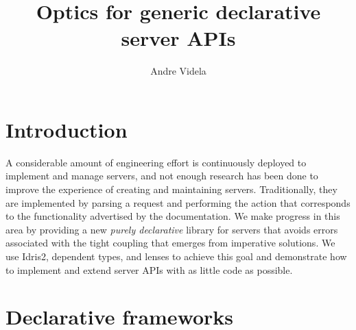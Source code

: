 \documentclass[sigplan,screen,review, nonacm]{acmart}
\begin{document}
\title{Optics for generic declarative server APIs}

\author{Andre Videla}



\maketitle
\hypertarget{introduction}{%
\section{Introduction}\label{introduction}}

A considerable amount of engineering effort is
continuously deployed to implement and manage servers, and not enough
research has been done to improve the experience of creating and maintaining
servers. Traditionally, they are implemented by parsing a request
and performing the action that corresponds to the functionality advertised
by the documentation. We make progress in
this area by providing a new \emph{purely declarative} library for
servers that avoids errors associated with
the tight coupling that emerges from imperative solutions. We use Idris2\cite{idris2},
dependent types, and lenses to achieve
this goal and demonstrate how to implement and extend server APIs with
as little code as possible.

\hypertarget{declarative-frameworks}{%
  \section{Declarative frameworks}\label{declarative-frameworks}}
\end{document}
